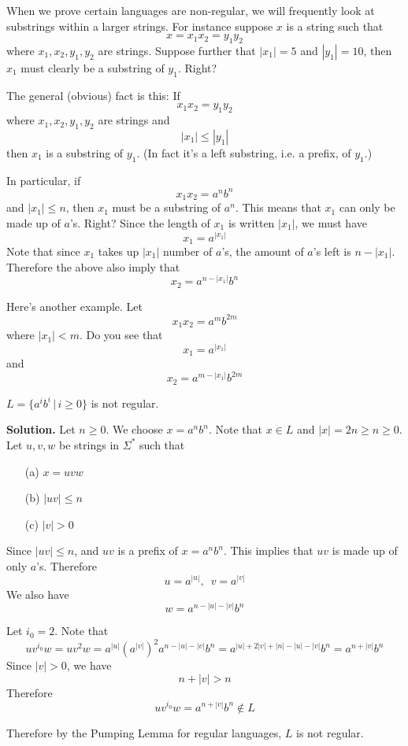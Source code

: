 



\newpage
When we prove certain languages are non-regular, 
we will frequently look at substrings within a larger strings. 
For instance suppose $x$ is a string such that
\[
x = x_1 x_2 = y_1 y_2
\]
where $x_1, x_2, y_1, y_2$ are strings.
Suppose further that $|x_1| = 5$ and $|y_1| = 10$,
then $x_1$ must clearly be a substring of $y_1$.
Right?

The general (obvious) fact is this:
If 
\[
x_1 x_2 = y_1 y_2
\]
where $x_1, x_2, y_1, y_2$ are strings and 
\[
|x_1| \leq |y_1|
\]
then $x_1$ is a substring of $y_1$.
(In fact it's a left substring, i.e. a prefix, of $y_1$.)


In particular, if
\[
x_1 x_2 = a^n b^n
\]
and $|x_1| \leq n$, then $x_1$ must be a substring of $a^n$.
This means that $x_1$ can only be made up of $a$'s.
Right?
Since the length of $x_1$ is written $|x_1|$, we must have
\[
x_1 = a^{|x_1|}
\]
Note that since $x_1$ takes up $|x_1|$ number of 
$a$'s, the amount of $a$'s left is $n - |x_1|$.
Therefore the above also imply that
\[
x_2 = a^{n - |x_1|} b^n
\]

Here's another example.
Let 
\[
x_1 x_2 = a^m b^{2m} 
\]
where $|x_1| < m$.
Do you see that
\[
x_1 = a^{|x_1|}
\]
and
\[
x_2 = a^{m - |x_1|} b^{2m}
\]

\newpage
\begin{eg}
 $L = \{a^ib^i \,|\, i\geq 0 \}$ is not regular.

\textbf{Solution.}
Let $n \geq 0$. We choose $x = a^nb^n$. Note that $x \in
L$ and $|x| = 2n \geq n \geq 0$. 
Let $u,v,w$ be strings in $\Sigma^*$ such that
\begin{enumerate}[label=\textnormal{(\alph*)},itemsep=0pt,nosep,noitemsep,partopsep=0pt,topsep=0pt,parsep=0pt]
 \item[(a)] $x = uvw$
 \item[(b)] $|uv| \leq n$
 \item[(c)] $|v| > 0$
\end{enumerate}

Since $|uv| \leq n$, and $uv$ is a prefix of $x = a^n b^n$.
This implies that $uv$ is made up of only $a$'s.
Therefore 
\[
u = a^{|u|}, \,\,\, v = a^{|v|}
\]
We also have 
\[
w = a^{n-|u|-|v|}b^n
\]

Let $i_0 = 2$. 
Note that
\[
u v^{i_0} w 
= uv^2w 
= a^{|u|} (a^{|v|})^2 a^{n - |u| - |v|}b^n 
= a^{|u|+2|v| + |n| - |u|- |v|}b^n = a^{n+|v|}b^n
\]
Since
$|v|>0$, we have
\[
n+|v| > n
\]
Therefore 
\[
uv^{i_0}w = a^{n+|v|}b^n \notin L
\]

Therefore by the Pumping Lemma for regular languages, $L$ is not
regular.
\end{eg}



